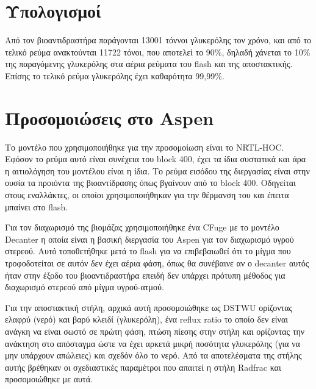 \documentclass[11pt]{article}
\begin{document}
\section{Υπολογισμοί}
\label{sec:org56f20c8}
Από τον βιοαντιδραστήρα παράγονται 13001 τόννοι γλυκερόλης τον
χρόνο, και από το τελικό ρεύμα ανακτούνται 11722 τόνοι, που αποτελεί το
90\%, δηλαδή χάνεται το 10\% της παραγόμενης γλυκερόλης στα αέρια
ρεύματα του flash και της αποστακτικής. Επίσης το τελικό ρεύμα
γλυκερόλης έχει καθαρότητα 99,99\%.

\section{Προσομοιώσεις στο Aspen}
\label{sec:org9f93df7}
Το μοντέλο που χρησιμοποιήθηκε για την προσομοίωση είναι το NRTL-HOC. Εφόσον το ρεύμα αυτό είναι συνέχεια του block 400, έχει τα ίδια συστατικά και άρα η αιτιολόγηση του μοντέλου είναι η ίδια. Το ρεύμα εισόδου της διεργασίας είναι στην ουσία τα προιόντα της βιοαντίδρασης όπως βγαίνουν από το block 400. Οδηγείται στους εναλλάκτες, οι οποίοι χρησιμοποιήθηκαν για την θέρμανση του και έπειτα μπαίνει στο flash.

Για τον διαχωρισμό της βιομάζας χρησιμοποιήθηκε ένα CFuge με το μοντέλο Decanter η οποία είναι η βασική διεργασία του Aspen για τον διαχωρισμό υγρού στερεού. Αυτό τοποθετήθηκε μετά το flash για να επιβεβαιωθεί ότι το μίγμα που τροφοδοτείται σε αυτόν δεν έχει αέρια φάση, όπως θα συνέβαινε αν ο decanter αυτός ήταν στην έξοδο του βιοαντιδραστήρα επειδή δεν υπάρχει πρότυπη μέθοδος για διαχωρισμό στερεού από μίγμα υγρού-ατμού.

Για την αποστακτική στήλη, αρχικά αυτή προσομοιώθηκε ως DSTWU ορίζοντας ελαφρύ (νερό) και βαρύ κλειδί (γλυκερόλη), ένα reflux ratio το οποίο δεν είναι ανάγκη να είναι σωστό σε πρώτη φάση, πτώση πίεσης στην στήλη και ορίζοντας την ανάκτηση στο απόσταγμα ώστε να έχει αρκετά μικρή ποσότητα γλυκερόλης (για να μην υπάρχουν απώλειες) και σχεδόν όλο το νερό. Από τα αποτελέσματα της στήλης αυτής βρέθηκαν οι σχεδιαστικές παραμέτροι που απαιτεί η στήλη Radfrac και προσομοιώθηκε με αυτά.
\end{document}
